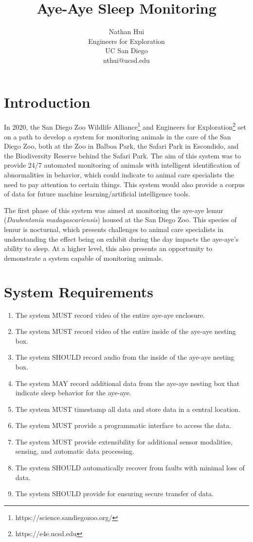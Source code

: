 \documentclass{article}
\title{Aye-Aye Sleep Monitoring}
\author{Nathan Hui\\Engineers for Exploration\\UC San Diego\\nthui@ucsd.edu}
\begin{document}
\maketitle
\section{Introduction}
In 2020, the San Diego Zoo Wildlife Alliance\footnote{https://science.sandiegozoo.org/} and Engineers for Exploration\footnote{https://e4e.ucsd.edu} set on a path to develop a system for monitoring animals in the care of the San Diego Zoo, both at the Zoo in Balboa Park, the Safari Park in Escondido, and the Biodiversity Reserve behind the Safari Park.  The aim of this system was to provide 24/7 automated monitoring of animals with intelligent identification of abnormalities in behavior, which could indicate to animal care specialists the need to pay attention to certain things.  This system would also provide a corpus of data for future machine learning/artificial intelligence tools.

The first phase of this system was aimed at monitoring the aye-aye lemur (\textit{Daubentonia madagascariensis}) housed at the San Diego Zoo.  This species of lemur is nocturnal, which presents challenges to animal care specialists in understanding the effect being on exhibit during the day impacts the aye-aye's ability to sleep.  At a higher level, this also presents an opportunity to demonstrate a system capable of monitoring animals.
\section{System Requirements}
\begin{enumerate}
    \item The system MUST record video of the entire aye-aye enclosure.
    \item The system MUST record video of the entire inside of the aye-aye nesting box.
    \item The system SHOULD record audio from the inside of the aye-aye nesting box.
    \item The system MAY record additional data from the aye-aye nesting box that indicate sleep behavior for the aye-aye.
    \item The system MUST timestamp all data and store data in a central location.
    \item The system MUST provide a programmatic interface to access the data.
    \item The system MUST provide extensibility for additional sensor modalities, sensing, and automatic data processing.
    \item The system SHOULD automatically recover from faults with minimal loss of data.
    \item The system SHOULD provide for ensuring secure transfer of data.
\end{enumerate}
\end{document}
